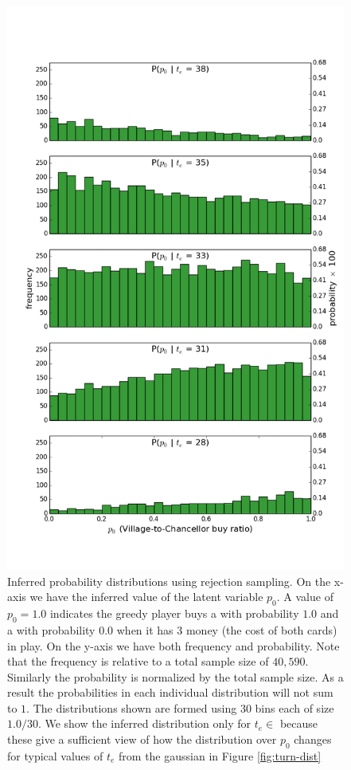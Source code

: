 \begin{figure}
\includegraphics[width=1.0\columnwidth]{../3-row-dist.png}
\caption{\label{fig:rejection-sampling} Inferred probability distributions
using rejection sampling. On the x-axis we have the inferred value of the
latent variable $p_0$. A value of $p_0 = 1.0$ indicates the greedy player
buys a  with probability $1.0$ and a  with
probability $0.0$ when it has $3$ money (the cost of both cards) in play.
On the y-axis we have both frequency and probability. Note that the frequency
is relative to a total sample size of $40,590$. Similarly the probability is
normalized by the total sample size. As a result the probabilities in each
individual distribution will not sum to $1$. The distributions shown are formed
using $30$ bins each of size $1.0 / 30$. We show the inferred distribution only
for $t_e \in$ \hsk{[38,35,33,31,28]} because these give a sufficient view of
how the distribution over $p_0$ changes for typical values of $t_e$ from
the gaussian in Figure \ref{fig:turn-dist}}
\end{figure}

